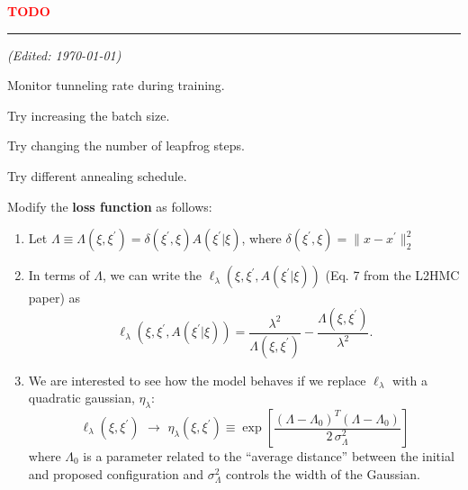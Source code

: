 \documentclass[11pt]{article}
\begin{document}
\noindent
\textbf{\textcolor{red}{\huge TODO}}\\
\noindent\rule{10cm}{0.4pt}\hfill\textit{(Edited: \today)}
\begin{todolist}
    \item Monitor tunneling rate during training.
    \item Try increasing the batch size.
    \item Try changing the number of leapfrog steps.
    \item Try different annealing schedule.
    \item Modify the \textbf{loss function} as follows:
    \begin{enumerate}
        \item Let $\Lambda \equiv \Lambda(\xi, \xi^{\prime}) = \delta(\xi^{\prime},
            \xi) A(\xi^{\prime} | \xi)$, where $\delta(\xi^{\prime}, \xi) = \|x - x^{\prime}\|_{2}^{2}$
        \item In terms of $\Lambda$, we can write the
            $\ell_{\lambda}(\xi, \xi^{\prime}, A(\xi^{\prime}|\xi))$ (Eq. 7 from
            the L2HMC paper) as 
            \begin{equation}
                \ell_{\lambda}(\xi, \xi^{\prime}, A(\xi^{\prime}|\xi)) =
                    \frac{\lambda^{2}}{\Lambda(\xi, \xi^{\prime})} - \frac{\Lambda(\xi,
                    \xi^{\prime})}{\lambda^{2}}.
            \end{equation}
        \item We are interested to see how the model behaves if we replace
            $\ell_{\lambda}$ with a quadratic gaussian, $\eta_{\lambda}$:
            \begin{equation}
                \ell_{\lambda}{(\xi, \xi^{\prime})} 
                \,\,\longrightarrow \,\,\eta_{\lambda}(\xi, \xi^{\prime}) 
                    \equiv \exp\left[\frac{{(\Lambda -
                \Lambda_0)}^{T}{(\Lambda - \Lambda_0)}}{2\, \sigma_{\Lambda}^{2}}\right] 
            \end{equation}
            where $\Lambda_0$ is a parameter related to the ``average distance''
            between the initial and proposed configuration and
            $\sigma_{\Lambda}^{2}$ controls the width of the Gaussian.
      \end{enumerate}
\end{todolist}
    
\end{document}
